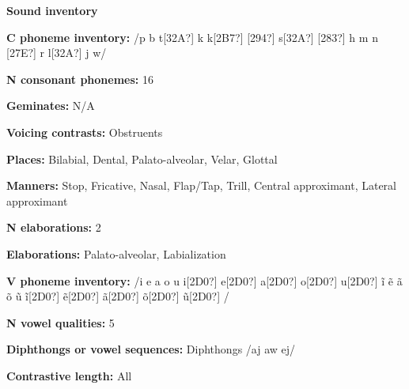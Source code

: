 \begin{styleBody}
\textbf{Sound inventory}
\end{styleBody}

\begin{styleBody}
\textbf{C phoneme inventory:} /p b t[32A?] k k[2B7?] [294?] s[32A?] [283?] h m n [27E?] r l[32A?] j w/
\end{styleBody}

\begin{styleBody}
\textbf{N consonant phonemes:} 16
\end{styleBody}

\begin{styleBody}
\textbf{Geminates:} N/A
\end{styleBody}

\begin{styleBody}
\textbf{Voicing contrasts:} Obstruents
\end{styleBody}

\begin{styleBody}
\textbf{Places:} Bilabial, Dental, Palato-alveolar, Velar, Glottal
\end{styleBody}

\begin{styleBody}
\textbf{Manners:} Stop, Fricative, Nasal, Flap/Tap, Trill, Central approximant, Lateral approximant
\end{styleBody}

\begin{styleBody}
\textbf{N elaborations:} 2
\end{styleBody}

\begin{styleBody}
\textbf{Elaborations:} Palato-alveolar, Labialization
\end{styleBody}

\begin{styleBody}
\textbf{V phoneme inventory:} /i e a o u i[2D0?] e[2D0?] a[2D0?] o[2D0?] u[2D0?] \~{i} \~{e} \~{a} \~{o} \~{u} \~{i}[2D0?] \~{e}[2D0?] \~{a}[2D0?] \~{o}[2D0?] \~{u}[2D0?] /
\end{styleBody}

\begin{styleBody}
\textbf{N vowel qualities:} 5
\end{styleBody}

\begin{styleBody}
\textbf{Diphthongs or vowel sequences:} Diphthongs /aj aw ej/
\end{styleBody}

\begin{styleBody}
\textbf{Contrastive length:} All
\end{styleBody}

